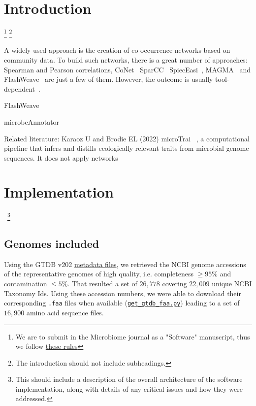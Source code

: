 \documentclass[sn-mathphys,Numbered]{sn-jnl}%
\theoremstyle{thmstyleone}%
\theoremstyle{thmstyletwo}%
\theoremstyle{thmstylethree}%
\begin{document}
\section{Introduction}
\label{sec1}
\footnote{We are to submit in the Microbiome journal as a "Software" manuscript, thus we follow 
\href{https://microbiomejournal.biomedcentral.com/submission-guidelines/preparing-your-manuscript/software-article}{these rules}}
\footnote{The introduction should not include subheadings.}

    A widely used approach is the creation of co-occurrence networks based on community data. To build such networks, there is a great number of approaches: Spearman and Pearson correlations, CoNet~\cite{faust2012microbial} SparCC~\cite{friedman2012inferring} SpiecEasi~\cite{kurtz2015sparse}, MAGMA~\cite{cougoul2019magma} and FlashWeave~\cite{flashweave_cite} are just a few of them.
    However, the outcome is usually tool-dependent~\cite{kishore2023inferring, weiss2016correlation, rottjers2018hairballs}. 

    FlashWeave 

    microbeAnnotator~\cite{ruiz2021microbeannotator} 


    Related literature:
    Karaoz U and Brodie EL (2022) microTrai~\cite{karaoz2022microtrait} , a computational pipeline that infers and distills ecologically relevant traits from microbial genome sequences.
    It does not apply networks









\section{Implementation}~\footnote{This should include a description of the overall architecture of the software implementation, along with details of any critical issues and how they were addressed.}
    \label{sec:implementation}

    \subsection*{Genomes included}
        \label{subsec:genomes}

        Using the GTDB v202 \href{https://data.gtdb.ecogenomic.org/releases/release202/202.0/}{metadata files}, we retrieved the NCBI genome accessions of the representative genomes of high quality, i.e. completeness $\geq 95\%$  and contamination $\leq 5\%$.
        That resulted a set of $26,778$ covering $22,009$ unique NCBI Taxonomy Ids.
        Using these accession numbers, we were able to download their corresponding \texttt{.faa} files when available (\href{https://github.com/hariszaf/microbetag/blob/develop/microbetagDB/mappings/gtdb_ncbi/get_gtdb_faa.py}{\texttt{get\_gtdb\_faa.py}}) leading to a set of $16,900$ amino acid sequence files.
\end{document}
